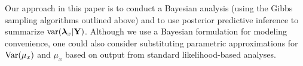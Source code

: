 \documentclass[12pt,fleqn]{article}
\begin{document}
\begin{flushleft}
\hspace{.5in} Our approach in this paper is to conduct a Bayesian analysis (using the Gibbs sampling algorithms outlined above) and to use posterior predictive inference to summarize ${\rm var}(\boldsymbol{\lambda}_x | {\bf Y})$.  Although we use a Bayesian formulation for modeling convenience, one could also consider substituting parametric approximations for ${\rm Var}(\mu_x)$ and $\mu_x$ based on output from standard likelihood-based analyses.


\renewcommand{\refname}{Literature Cited}




\end{flushleft}
\end{document}
